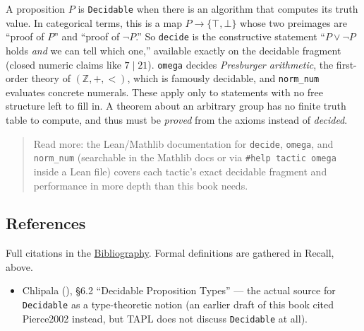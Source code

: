 \begin{mathreading}

A proposition \(P\) is \texttt{Decidable} when there is an algorithm that computes its truth value. In categorical terms, this is a map \(P \to \{\top, \bot\}\) whose two preimages are ``proof of \(P\)'' and ``proof of \(\neg P\).'' So \texttt{decide} is the constructive statement ``\(P \vee
\neg P\) holds \emph{and} we can tell which one,'' available exactly on the decidable fragment (closed numeric claims like \(7 \mid 21\)). \texttt{omega} decides \emph{Presburger arithmetic}, the first-order theory of \((\mathbb{Z},
+, <)\), which is famously decidable, and \texttt{norm\_\allowbreak{}num} evaluates concrete numerals. These apply only to statements with no free structure left to fill in. A theorem about an arbitrary group has no finite truth table to compute, and thus must be \emph{proved} from the axioms instead of \emph{decided}.

\end{mathreading}

\begin{quote}
Read more: the Lean/Mathlib documentation for \texttt{decide}, \texttt{omega}, and \texttt{norm\_\allowbreak{}num} (searchable in the Mathlib docs or via \texttt{\#help tactic omega} inside a Lean file) covers each tactic's exact decidable fragment and performance in more depth than this book needs.
\end{quote}

\subsection{References}\label{sec:12-working-efficiently:02-decision-procedures:3}

Full citations in the \hyperref[sec:root:bibliography:1]{Bibliography}. Formal definitions are gathered in Recall, above.

\begin{itemize}
\tightlist
\item
  Chlipala (\cite{Chlipala2013}), §6.2 ``Decidable Proposition Types'' --- the actual source for \texttt{Decidable} as a type-theoretic notion (an earlier draft of this book cited Pierce2002 instead, but TAPL does not discuss \texttt{Decidable} at all).
\end{itemize}
